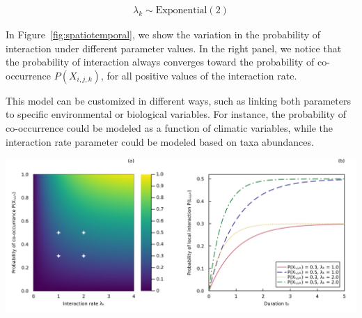 \begin{box2.1}
\begin{eqnarray}
  \label{eq:modellambda}
  \lambda_k \sim \text{Exponential}(2)
\end{eqnarray}

In Figure~\ref{fig:spatiotemporal}, we show the variation in the probability of
interaction under different parameter values. In the right panel, we notice
that the probability of interaction always converges toward the probability of
co-occurrence $P(X_{i,j,k})$, for all positive values of the interaction rate. 

This model can be customized in different ways, such as linking both
parameters to specific environmental or biological variables. For instance,
the probability of co-occurrence could be modeled as a function of climatic
variables, while the interaction rate parameter could be modeled based on taxa
abundances.

\clearpage

\includegraphics[width=\textwidth]{figures/article1/spatiotemporal_model.png}
\captionsetup{justification=justified}
\label{fig:spatiotemporal}

\end{box2.1}


